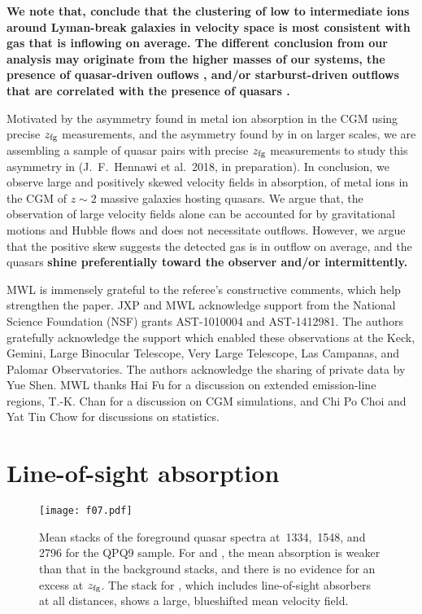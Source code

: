 \documentclass[iop]{emulateapj}
\begin{document}
{\bf We note that, \cite{Turner+17} conclude that the clustering of low to intermediate ions around
Lyman-break galaxies in velocity space is
most consistent with gas that is inflowing on average. The different conclusion from our analysis
may originate from the higher masses of our systems, the presence of quasar-driven ouflows
\citep[e.g.,][]{Greene+12}, and/or starburst-driven outflows that are correlated with the presence
of quasars \citep[e.g.,][]{Barthel+17}.}

Motivated by the asymmetry found in metal ion absorption in the CGM using precise $z_{\rm fg}$
measurements, and the asymmetry found by \cite{KirkmanTytler08} in  on larger
scales, we are assembling a sample of quasar pairs with precise $z_{\rm fg}$ measurements to study
this asymmetry in  (J.\ F.\ Hennawi et al.\ 2018, in preparation). In conclusion, we
observe large and positively skewed velocity fields in absorption, of metal ions
in the CGM of $z\sim2$ massive galaxies hosting quasars.
We argue that, the observation of large velocity fields alone can be accounted for by
gravitational motions and Hubble flows and does not necessitate outflows. However, we argue that the
positive skew suggests the detected gas is in outflow on average, and the quasars {\bf shine
preferentially toward the observer and/or intermittently.}

\acknowledgements
MWL is immensely grateful to the referee's constructive comments, which help strengthen the
paper.
JXP and MWL acknowledge support from the National Science Foundation (NSF) grants AST-1010004 and
AST-1412981. The authors gratefully acknowledge the support which enabled these observations at
the Keck, Gemini, Large Binocular Telescope, Very Large Telescope, Las Campanas, and Palomar
Observatories. The authors acknowledge the sharing of private data by Yue Shen. MWL thanks Hai Fu
for a discussion on extended emission-line regions, T.-K. Chan for a discussion on CGM
simulations, and Chi Po Choi and Yat Tin Chow for discussions on statistics.

\appendix

\section{Line-of-sight absorption}
\label{sec:appendix}

\begin{figure}
\texttt{[image: f07.pdf]}
\caption{Mean stacks of the foreground quasar spectra at \,1334, \,1548, and
\,2796 for the QPQ9 sample. For  and , the mean absorption is
weaker than that in the background stacks, and there is no evidence for an excess at $z_{\rm fg}$.
The stack for , which includes line-of-sight absorbers at all distances, shows a large,
blueshifted mean velocity field.
}
\label{fig:stacks_fg}
\end{figure}
\end{document}
